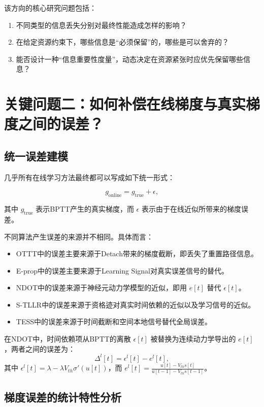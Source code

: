 \documentclass[journal,12pt,onecolumn]{IEEEtran}
\begin{document}
该方向的核心研究问题包括：
\begin{enumerate}
    \item 不同类型的信息丢失分别对最终性能造成怎样的影响？
    \item 在给定资源约束下，哪些信息是“必须保留”的，哪些是可以舍弃的？
    \item 能否设计一种“信息重要性度量”，动态决定在资源紧张时应优先保留哪些信息？
\end{enumerate}

\section{关键问题二：如何补偿在线梯度与真实梯度之间的误差？}

\subsection{统一误差建模}

几乎所有在线学习方法最终都可以写成如下统一形式：

\[
\boxed{
g_{\mathrm{online}} = g_{\mathrm{true}} + \epsilon,
}
\]

其中 \(g_{\mathrm{true}}\) 表示BPTT产生的真实梯度，而 \(\epsilon\) 表示由于在线近似所带来的梯度误差。

不同算法产生误差的来源并不相同。具体而言：
\begin{itemize}
    \item OTTT中的误差主要来源于Detach带来的梯度截断，即丢失了重置路径信息。
    \item E-prop中的误差主要来源于Learning Signal对真实误差信号的替代。
    \item NDOT中的误差来源于神经元动力学模型的近似，即用 \(e[t]\) 替代 \(\epsilon[t]\)。
    \item S-TLLR中的误差来源于资格迹对真实时间依赖的近似以及学习信号的近似。
    \item TESS中的误差来源于时间截断和空间本地信号替代全局误差。
\end{itemize}

在NDOT中，时间依赖项从BPTT的离散 \(\epsilon[t]\) 被替换为连续动力学导出的 \(e[t]\)，两者之间的误差为：
\[
\Delta^l[t] = \epsilon^l[t] - e^l[t],
\]
其中 \(\epsilon^l[t] = \lambda - \lambda V_{th}\sigma'(u[t])\)，而 \(e^l[t] = \frac{u[t] - V_{th}s[t]}{u[t-1] - V_{th}s[t-1]}\)。

\subsection{梯度误差的统计特性分析}
\end{document}
